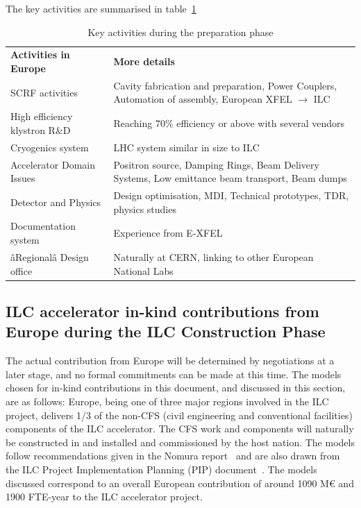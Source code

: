 \documentclass[%
 reprint,
 floatfix,
 amsmath,amssymb,
 aps,
]{revtex4-1}
\begin{document}
The key activities are summarised in table~\ref{fig:prep-phase-summary} 




\begin{table}[htbp]
\begin{ruledtabular}
\begin{tabular}{p{3.5cm}p{4.75cm}}
 \bfseries {Activities in Europe} &\bfseries{More details}                                                         \\
SCRF activities			&Cavity fabrication and preparation, Power Couplers, Automation of assembly, European XFEL $\rightarrow$ ILC\\
High efficiency klystron R\&D   &Reaching 70\% efficiency or above with several vendors   \\
Cryogenics system               &LHC system similar in size to ILC\\
Accelerator Domain Issues       &Positron source, Damping Rings, Beam Delivery Systems, Low emittance beam transport, Beam dumps\\
Detector and Physics            &Design optimisation, MDI, Technical prototypes, TDR, physics studies\\
Documentation system            &Experience from E-XFEL                                       \\
âRegionalâ Design office        &Naturally at CERN, linking to other European National Labs \\
\end{tabular}
\end{ruledtabular}
\caption{\label{fig:prep-phase-summary} Key activities during the preparation phase}
\end{table}


\subsection{ILC accelerator in-kind contributions from Europe during the ILC Construction Phase ~\label{sec:acc:constrphase}}

The actual contribution from Europe will be determined by negotiations at a 
later stage, and no formal commitments can be made at this time. The models 
chosen for in-kind contributions in this document, and discussed in this 
section, are as follows: Europe, being one of three major regions involved in 
the ILC project, delivers 1/3 of the non-CFS (civil engineering and conventional facilities) 
components of the ILC accelerator. The CFS work 
and components will naturally be constructed in and installed and 
commissioned by the host nation. The models follow recommendations given in 
the Nomura report~\cite{Nomura-eng} and are also drawn from the ILC Project Implementation 
Planning (PIP) document~\cite{ILCPIP}. The models discussed correspond to an overall 
European contribution of around 1090 M\euro{} and 1900 FTE-year to the ILC accelerator project. 
\end{document}
